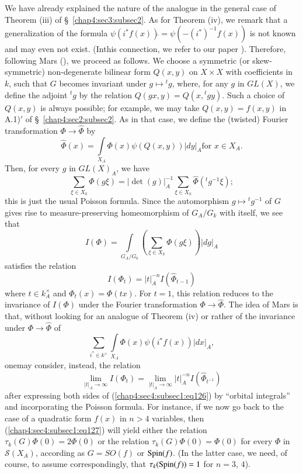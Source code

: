 We have already explained the nature of the analogue in the general
case of Theorem (iii) of \S\ \ref{chap4:sec3:subsec2}. As for Theorem (iv), we remark
that a generalization of the formula
$\psi(i^{\ast}f(x))\hat{}=\psi(-(i^{\ast})^{-1}f(x))$ is not known and
may even not exist. (In\pageoriginale this connection, we refer to our
paper \cite{Igu 6}). Therefore, following Mars (\cite{Mar}), we proceed as
follows. We choose a symmetric (or skew-symmetric) non-degenerate
bilinear form $Q(x,y)$ on $X\times X$ with coefficients in $k$, such
that $G$ becomes invariant under $g\mapsto {}^{t}g$, where, for any
$g$ in $GL(X)$, we define the adjoint ${}^{t}g$ by the relation
$Q(gx,y)=Q(x,{}^{t}gy)$. Such a choice of $Q(x,y)$ is always possible;
for example, we may take $Q(x,y)=f(x,y)$ in A.1)$'$ of
\S\ \ref{chap4:sec2:subsec2}. As in that case, we define the (twisted) Fourier
transformation $\Phi\to \hat{\Phi}$ by
$$
\hat{\Phi}(x)=\int\limits_{X_{A}}\Phi(x)\psi(Q(x,y))|dy|_{A}\text{
  \ for \ } x\in X_{A}.
$$
Then, for every $g$ in $GL(X)_{A}$, we have
$$
\sum_{\xi\in X_{k}}\Phi(g\xi)=|\det(g)|^{-1}_{A}\sum_{\xi\in
  X_{k}}\hat{\Phi}({}^{t}g{}^{-1}\xi); 
$$
this is just the usual Poisson formula. Since the automorphism
$g\mapsto {}^{t}g^{-1}$ of $G$ gives rise to measure-preserving
homeomorphism of $G_{A}/G_{k}$ with itself, we see that
$$
I(\Phi)=\int\limits_{G_{A}/G_{k}}\left(\sum_{\xi \in
  X_{k}}\Phi(g\xi)\right)|dg|_{A}
$$
satisfies the relation
\begin{equation*}
I(\Phi_{t})=|t|^{-n}_{A}I(\hat{\Phi}_{t-1})\tag{126}
\label{chap4:sec4:subsec1:eq126} 
\end{equation*}
where $t\in k^{\times}_{A}$ and $\Phi_{t}(x)=\Phi(tx)$. For $t=1$, this
relation reduces to the invariance of $I(\Phi)$ under the Fourier
transformation $\Phi\to \hat{\Phi}$. The idea of Mars is that,
without looking for an analogue of Theorem (iv) or rather of the
invariance under $\Phi\to \hat{\Phi}$ of
$$
\sum_{i^{\ast}\in k^{\times}}\int\limits_{X_{A}}\Phi(x)\psi(i^{\ast}f(x))|dx|_{A},
$$
one\pageoriginale may consider, instead, the relation
\begin{equation*}
\lim\limits_{|t|_{A}\to \infty}I(\Phi_{t})=\lim\limits_{|t|_{A}\to
  \infty}|t|^{-n}_{A}I(\hat{\Phi}_{t^{-1}})\tag{127}
 \label{chap4:sec4:subsec1:eq127} 
\end{equation*}
after expressing both sides of (\ref{chap4:sec4:subsec1:eq126}) by ``orbital integrals''
and incorporating the Poisson formula. For instance, if we now go back
to the case of a quadratic form $f(x)$ in $n>4$ variables, then
(\ref{chap4:sec4:subsec1:eq127}) will yield either the relation
$\tau_{k}(G)\Phi(0)=2\Phi(0)$ or the relation
$\tau_{k}(G)\Phi(0)=\Phi(0)$ for every $\Phi$ in $\mathscr{S}(X_{A})$,
according as $G=SO(f)$ or $\operatorname{Spin} (f)$. (In the latter case, we need,
of course, to assume correspondingly, that $\tau_{k}(\operatorname{Spin} (f))=1$ for
$n=3$, $4$).

